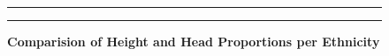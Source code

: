 \documentclass[]{article}
\begin{document}
\begin{figure}[!ht]
    \hrule
    \caption{ \textbf{Comparision of Height and Head Proportions per Ethnicity} }
    \begin{center}
    \end{center}
    \label{fig:OnePlot}
    \hrule
\end{figure}

\newpage
\end{document}
